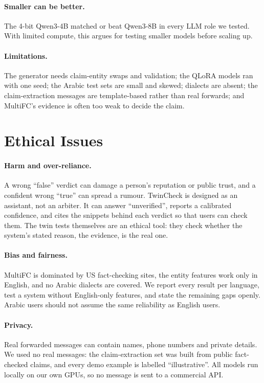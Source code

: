 \paragraph{Smaller can be better.}
The 4-bit Qwen3-4B matched or beat Qwen3-8B in every LLM role we tested. With limited compute, this argues for testing smaller models before scaling up.

\paragraph{Limitations.}
The  generator needs claim-entity swaps and validation; the QLoRA models ran with one seed; the Arabic test sets are small and skewed; dialects are absent; the claim-extraction messages are template-based rather than real forwards; and MultiFC's evidence is often too weak to decide the claim.

\section{Ethical Issues}

\paragraph{Harm and over-reliance.}
A wrong ``false'' verdict can damage a person's reputation or public trust, and a confident wrong ``true'' can spread a rumour. TwinCheck is designed as an assistant, not an arbiter. It can answer ``unverified'', reports a calibrated confidence, and cites the snippets behind each verdict so that users can check them. The twin tests themselves are an ethical tool: they check whether the system's stated reason, the evidence, is the real one.

\paragraph{Bias and fairness.}
MultiFC is dominated by US fact-checking sites, the entity features work only in English, and no Arabic dialects are covered. We report every result per language, test a system without English-only features, and state the remaining gaps openly. Arabic users should not assume the same reliability as English users.

\paragraph{Privacy.}
Real forwarded messages can contain names, phone numbers and private details. We used no real messages: the claim-extraction set was built from public fact-checked claims, and every demo example is labelled ``illustrative''. All models run locally on our own GPUs, so no message is sent to a commercial API.


